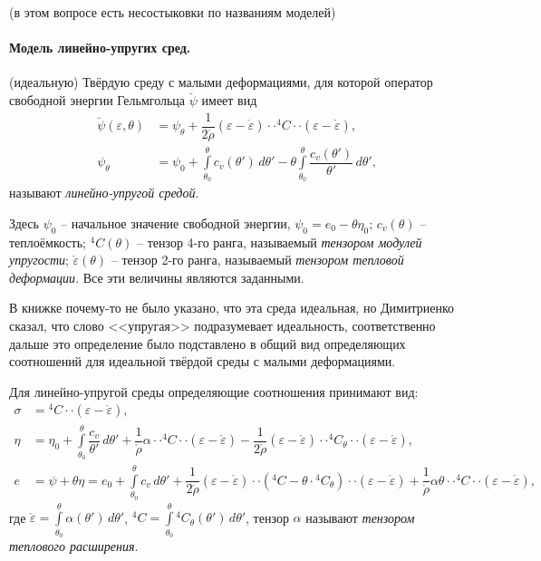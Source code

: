 
(в этом вопросе есть несостыковки по названиям моделей)

\paragraph{Модель линейно-упругих сред.}
\begin{definition}
  (идеальную) Твёрдую среду с малыми деформациями, для которой оператор свободной энергии Гельмгольца
  $\breve{\psi}$ имеет вид
  \begin{align*}
    \breve{\psi}(\varepsilon, \theta) &= \psi_\theta + \dfrac{1}{2\mathring{\rho}} (\varepsilon - \mathring{\varepsilon}) \cdot\cdot {}^4 C \cdot\cdot (\varepsilon - \mathring{\varepsilon}), \\
    \psi_\theta &= \psi_0 + \int\limits_{\theta_0}^\theta c_v(\theta') \, d\theta' - \theta \int\limits_{\theta_0}^\theta \dfrac{c_v(\theta')}{\theta'} \, d\theta',
  \end{align*}
  называют \emph{линейно-упругой средой}.

  Здесь $\psi_0$ -- начальное значение свободной энергии, $\psi_0 = e_0 - \theta \eta_0$;
  $c_v(\theta)$ -- теплоёмкость;
  ${}^4 C (\theta)$ -- тензор 4-го ранга, называемый \emph{тензором модулей упругости};
  $\mathring{\varepsilon}(\theta)$ -- тензор 2-го ранга, называемый \emph{тензором тепловой деформации}.
  Все эти величины являются заданными.
\end{definition}
\begin{remark}
  В книжке почему-то не было указано, что эта среда идеальная, но Димитриенко сказал, что
  слово <<упругая>> подразумевает идеальность, соответственно дальше это определение было
  подставлено в общий вид определяющих соотношений для идеальной твёрдой среды с малыми
  деформациями.
\end{remark}

Для линейно-упругой среды определяющие соотношения принимают вид:
\begin{align*}
  \sigma &= {}^4 C \cdot\cdot (\varepsilon - \mathring{\varepsilon}), \\
  \eta &= \eta_0 + \int\limits_{\theta_0}^\theta \dfrac{c_v}{\theta'} \, d\theta' + \dfrac{1}{\mathring{\rho}} \alpha \cdot\cdot {}^4 C \cdot\cdot (\varepsilon - \mathring{\varepsilon}) - \dfrac{1}{2\mathring{\rho}} (\varepsilon - \mathring{\varepsilon}) \cdot\cdot {}^4 C_\theta \cdot\cdot (\varepsilon - \mathring{\varepsilon}), \\
  e &= \psi + \theta \eta = e_0 + \int\limits_{\theta_0}^\theta c_v \, d\theta' + \dfrac{1}{2\mathring{\rho}} (\varepsilon - \mathring{\varepsilon}) \cdot\cdot \left( {}^4 C - \theta \cdot {}^4 C_\theta \right) \cdot\cdot (\varepsilon - \mathring{\varepsilon}) + \dfrac{1}{\mathring{\rho}} \alpha \theta \cdot\cdot{}^4 C \cdot\cdot (\varepsilon - \mathring{\varepsilon}),
\end{align*}
где $\mathring{\varepsilon} = \int\limits_{\theta_0}^\theta \alpha(\theta') \, d\theta'$,
${}^4 C = \int\limits_{\theta_0}^\theta {}^4 C_\theta(\theta') \, d\theta'$,
тензор $\alpha$ называют \emph{тензором теплового расширения}. 

